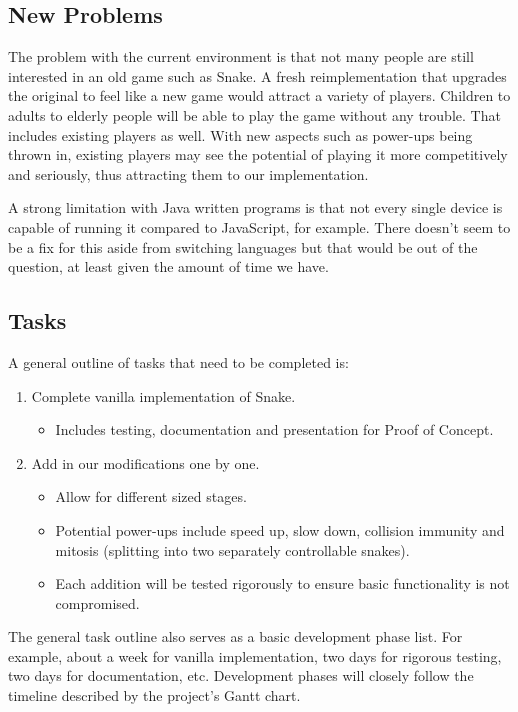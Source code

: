 \documentclass[12pt, titlepage]{article}
\begin{document}
\subsection{New Problems}
The problem with the current environment is that not many people are still interested in an old game such as Snake. A fresh reimplementation that upgrades the original to feel like a new game would attract a variety of players. Children to adults to elderly people will be able to play the game without any trouble. That includes existing players as well. With new aspects such as power-ups being thrown in, existing players may see the potential of playing it more competitively and seriously, thus attracting them to our implementation.

A strong limitation with Java written programs is that not every single device is capable of running it compared to JavaScript, for example. There doesn't seem to be a fix for this aside from switching languages but that would be out of the question, at least given the amount of time we have. 

\subsection{Tasks}
A general outline of tasks that need to be completed is:
\begin{enumerate}
	\item Complete vanilla implementation of Snake.
	\begin{itemize}
		\item Includes testing, documentation and presentation for Proof of Concept.
	\end{itemize}
	\item Add in our modifications one by one.
	\begin{itemize}
		\item Allow for different sized stages.
		\item Potential power-ups include speed up, slow down, collision immunity and mitosis (splitting into two separately controllable snakes).
		\item Each addition will be tested rigorously to ensure basic functionality is not compromised.
	\end{itemize}
\end{enumerate}

The general task outline also serves as a basic development phase list. For example, about a week for vanilla implementation, two days for rigorous testing, two days for documentation, etc. Development phases will closely follow the timeline described by the project's Gantt chart.
\end{document}
